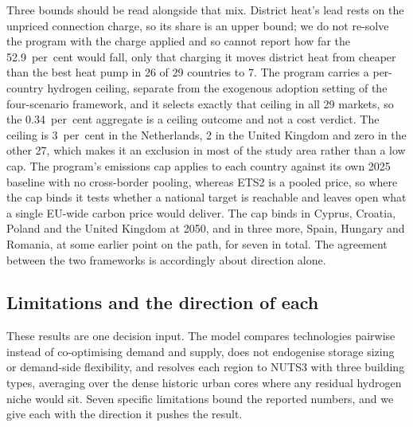Three bounds should be read alongside that mix. District heat's lead rests on the
unpriced connection charge, so its share is an upper bound; we do not re-solve the
program with the charge applied and so cannot report how far the 52.9~per~cent would
fall, only that charging it moves district heat from cheaper than the best heat pump in 26
of 29 countries to 7.
The program carries a per-country hydrogen ceiling, separate from the exogenous adoption
setting of the four-scenario framework, and it selects exactly that ceiling in all 29
markets, so the 0.34~per~cent aggregate is a ceiling outcome and not a cost verdict. The
ceiling is 3~per~cent in the Netherlands, 2 in the United Kingdom and zero in the other
27, which makes it an exclusion in most of the study area rather than a low cap. The program's emissions cap applies to each country against its own 2025 baseline with no cross-border pooling, whereas ETS2 is a
pooled price, so where the cap binds it tests whether a national target is reachable and
leaves open what a single EU-wide carbon price would deliver. The cap binds in Cyprus,
Croatia, Poland and the United Kingdom at 2050, and in three more, Spain, Hungary and
Romania, at some earlier point on the path, for seven in total. The agreement between the two frameworks is accordingly about direction alone.

\subsection{Limitations and the direction of each}
\label{sec:results:limitations}

These results are one decision input. The model compares technologies pairwise instead of
co-optimising demand and supply, does not endogenise storage sizing or demand-side
flexibility, and resolves each region to NUTS3 with three building types, averaging over
the dense historic urban cores where any residual hydrogen niche would sit. Seven
specific limitations bound the reported numbers, and we give each with the direction it
pushes the result.

